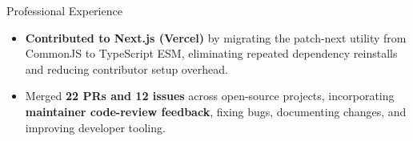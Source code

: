 \documentclass{resume}
\begin{document}
\begin{experienceSection}{Professional Experience}
\begin{itemize}
    \end{itemize}

    \experienceItem[
        company={Open Source Contributor | Remote},
        location={},
        position={},
        duration={July 2025 - May 2026}
    ]
    \begin{itemize}
        \itemsep -6pt {}
        \item \textbf{Contributed to Next.js (Vercel)} by migrating the patch-next utility from CommonJS to TypeScript ESM, eliminating repeated dependency reinstalls and reducing contributor setup overhead.
        \item Merged \textbf{22 PRs and 12 issues} across open-source projects, incorporating \textbf{maintainer code-review feedback}, fixing bugs, documenting changes, and improving developer tooling.
    \end{itemize}
\end{experienceSection}
\end{document}

